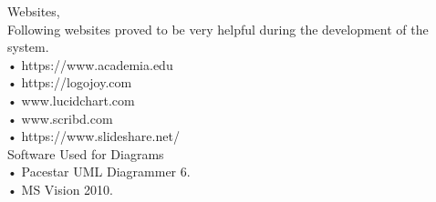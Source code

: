 \renewcommand\bibname{References}
\begin{thebibliography}{99}





 Websites,\\
Following websites proved to be very helpful during the development of the system.\\
•	https://www.academia.edu \\
•	https://logojoy.com \\
•	www.lucidchart.com \\ 
•	www.scribd.com \\
•	https://www.slideshare.net/ \\




 Software Used for Diagrams\\
•	Pacestar UML Diagrammer 6.\\
•	MS Vision 2010.\\


\end{thebibliography}
